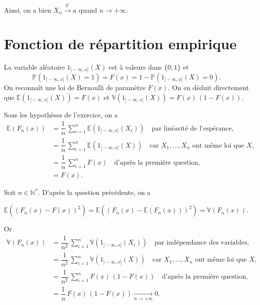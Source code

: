 Ainsi, on a bien \(X_n \overset{\mathbb{P}}{\longrightarrow} a\) quand
\(n\to+\infty\).

\section{Fonction de répartition
empirique}\label{IV-fonction-de-ruxe9partition-empirique-1}

\label{IV-answer-fdremp-loi}
La variable aléatoire \(1_{]-\infty,x]}(X)\) est à valeurs dans
\(\{0,1\}\) et
\[\mathbb{P}\left( 1_{]-\infty,x]}(X) = 1\right) = F(x) = 1 - \mathbb{P}\left( 1_{]-\infty,x]}(X) = 0\right).\]
On reconnaît une loi de Bernoulli de paramètre \(F(x)\). On en déduit
directement que \(\mathbb{E}(1_{]-\infty,x]}(X)) = F(x)\) et
\(\mathbb{V}(1_{]-\infty,x]}(X)) = F(x)\,(1-F(x))\).

\label{IV-answer-fdremp-biais}
Sous les hypothèses de l'exercice, on a \begin{align*}
\mathbb{E}\left(F_n(x) \right) &= \dfrac{1}{n}\,\sum_{i = 1}^n \mathbb{E}\left( 1_{]-\infty,x]}(X_i) \right) \hspace{1em}\text{par linéarité de l'espérance,}\\
& = \dfrac{1}{n}\,\sum_{i = 1}^n \mathbb{E}\left( 1_{]-\infty,x]}(X) \right) \hspace{1em}\text{car $X_1,\dots,X_n$ ont même loi que $X$,}\\
& = \dfrac{1}{n}\,\sum_{i = 1}^n F(x) \hspace{1em}\text{d'après la première question,}\\
& = F(x).
\end{align*}

\label{IV-answer-fdremp-mse}
Soit \(n\in\mathbb{N}^\ast\). D'après la question précédente, on a

\(\mathbb{E}\left( \left(F_n(x) - F(x)\right)^2 \right) = \mathbb{E}\left( \left(F_n(x) - \mathbb{E}(F_n(x))\right)^2 \right) = \mathbb{V}\left(F_n(x)\right).\)

Or \begin{align*}
\mathbb{V}\left(F_n(x)\right) &= \dfrac{1}{n^2}\,\sum_{i = 1}^n \mathbb{V}\left(1_{]-\infty,x]}(X_i)\right) \hspace{1em}\text{par indépendance des variables,}\\
&= \dfrac{1}{n^2}\,\sum_{i = 1}^n \mathbb{V}\left(1_{]-\infty,x]}(X)\right) \hspace{1em}\text{car $X_1,\dots,X_n$ ont même loi que $X$,}\\
&= \dfrac{1}{n^2}\,\sum_{i = 1}^n F(x)\,(1-F(x)) \hspace{1em}\text{d'après la première question,}\\
&= \dfrac{1}{n}\, F(x)\,(1-F(x)) \xrightarrow[n\to+\infty]{} 0.
\end{align*}

